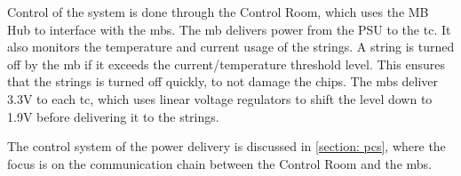 \documentclass[main.tex]{subfiles}
\begin{document}
Control of the system is done through the Control Room, which uses the MB Hub to interface with the \acrlong{mb}s. The \gls{mb} delivers power from the PSU to the \gls{tc}. It also monitors the temperature and current usage of the strings. A string is turned off by the \acrlong{mb} if it exceeds the current/temperature threshold level. This ensures that the strings is turned off quickly, to not damage the chips. The \gls{mb}s deliver 3.3V to each \gls{tc}, which uses linear voltage regulators to shift the level down to 1.9V before delivering it to the strings.

The control system of the power delivery is discussed in \autoref{section: pcs}, where the focus is on the communication chain between the Control Room and the \acrlong{mb}s.

\end{document}
